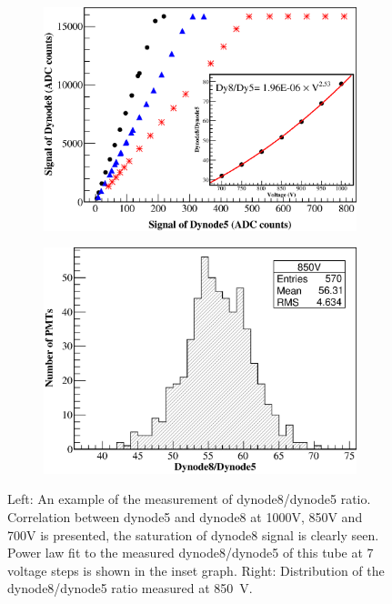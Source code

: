 \documentclass{JINST}
\begin{document}
\begin{figure}[tbp]
	
	\begin{subfigure}[t]{0.5\textwidth}
		\includegraphics[width=\linewidth]{FIG10}
	\end{subfigure}
	\begin{subfigure}[t]{0.5\textwidth}
		\includegraphics[width=\linewidth]{dy58_dist_850V}
	\end{subfigure}
	
	\caption{Left: An example of the measurement of dynode8/dynode5 ratio.
		Correlation between dynode5 and dynode8 at 1000V, 850V and 700V is presented, the saturation of dynode8 signal is clearly seen.
		Power law fit to the measured dynode8/dynode5 of this tube at 7 voltage steps is shown in the inset graph. 
		Right: Distribution of the dynode8/dynode5 ratio measured at \SI{850}{\volt}.}
	\label{fig:FIG6}
\end{figure}
\end{document}
